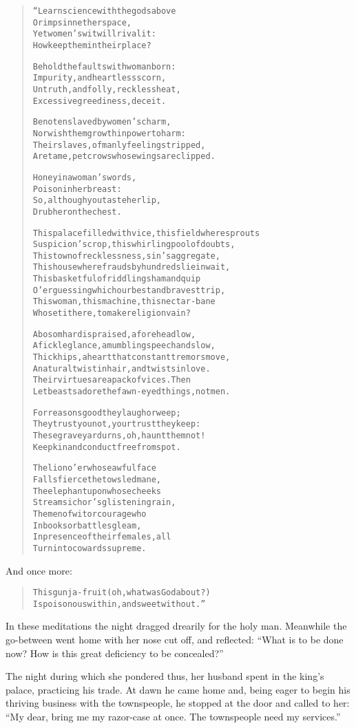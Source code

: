 \documentclass[article, twoside, 14pt]{memoir}
\renewenvironment{verbatim}{%
\begin{quote}%
\vskip -10pt%
\begin{alltt}\normalfont\large}{\end{alltt}%
\end{quote}%
\vskip -10pt
} %
\begin{document}
\begin{verbatim}
“Learn science with the gods above
    Or imps in nether space,
Yet women's wit will rival it:
    How keep them in their place?

Behold the faults with woman born:
Impurity, and heartless scorn,
Untruth, and folly, reckless heat,
Excessive greediness, deceit.

Be not enslaved by women's charm,
Nor wish them growth in power to harm:
Their slaves, of manly feeling stripped,
Are tame, pet crows whose wings are clipped.

Honey in a woman's words,
    Poison in her breast:
So, although you taste her lip,
    Drub her on the chest.

This palace filled with vice, this field where sprouts
Suspicion's crop, this whirling pool of doubts,
This town of recklessness, sin's aggregate,
This house where frauds by hundreds lie in wait,
This basketful of riddling sham and quip
O'er guessing which our best and bravest trip,
This woman, this machine, this nectar-bane{\textemdash}
Who set it here, to make religion vain?

A bosom hard is praised, a forehead low,
A fickle glance, a mumbling speech and slow,
Thick hips, a heart that constant tremors move,
A natural twist in hair, and twists in love.
Their virtues are a pack of vices. Then
Let beasts adore the fawn-eyed things, not men.

For reasons good they laugh or weep;
They trust you not, your trust they keep:
These graveyard urns, oh, haunt them not!
Keep kin and conduct free from spot.

The lion o'er whose awful face
    Falls fierce the towsled mane,
The elephant upon whose cheeks
    Streams ichor's glistening rain,
The men of wit or courage who
    In books or battles gleam,
In presence of their females, all
    Turn into cowards supreme.
\end{verbatim}
And once more:

\begin{verbatim}
This gunja-fruit (oh, what was God about?)
Is poisonous within, and sweet without.”
\end{verbatim}
In these meditations the night dragged drearily for the holy man.
Meanwhile the go-between went home with her nose cut off, and
reflected:
``What is to be done now? How is this great deficiency to be concealed?''

The night during which she pondered thus, her husband spent in the
king's palace, practicing his trade. At dawn he came home and,
being eager to begin his thriving business with the townspeople, he
stopped at the door and called to her:
``My dear, bring me my razor-case at once. The townspeople need my services.''
\end{document}

